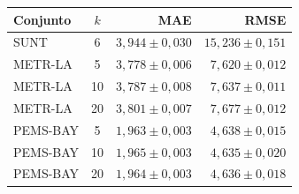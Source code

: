 \begin{tabular}{lcrr}
\toprule
Conjunto & $k$ & MAE & RMSE \\
\midrule
SUNT & 6 & $3,944 \pm 0,030$ & $15,236 \pm 0,151$ \\
METR-LA & 5 & $3,778 \pm 0,006$ & $7,620 \pm 0,012$ \\
METR-LA & 10 & $3,787 \pm 0,008$ & $7,637 \pm 0,011$ \\
METR-LA & 20 & $3,801 \pm 0,007$ & $7,677 \pm 0,012$ \\
PEMS-BAY & 5 & $1,963 \pm 0,003$ & $4,638 \pm 0,015$ \\
PEMS-BAY & 10 & $1,965 \pm 0,003$ & $4,635 \pm 0,020$ \\
PEMS-BAY & 20 & $1,964 \pm 0,003$ & $4,636 \pm 0,018$ \\
\bottomrule
\end{tabular}

